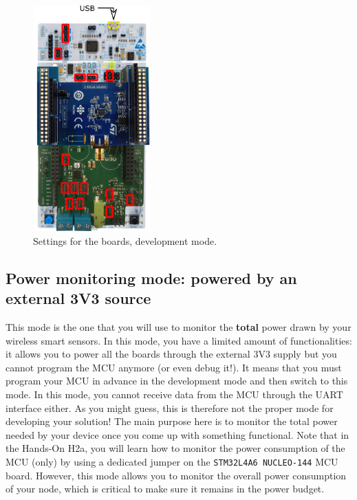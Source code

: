 \begin{figure}[h!]
    \centering
    \includegraphics[width=0.4\textwidth]{figs/settings-mode-dev.png}
    \caption{Settings for the boards, development mode.}
    \label{fig:settings-mode-dev}
\end{figure}

\clearpage
\subsection{Power monitoring mode: powered by an external 3V3 source} \label{sec:mode-3V3}

This mode is the one that you will use to monitor the \textbf{total} power drawn by your wireless smart sensors. In this mode, you have a limited amount of functionalities: it allows you to power all the boards through the external 3V3 supply but you cannot program the MCU anymore (or even debug it!). It means that you must program your MCU in advance in the development mode and then switch to this mode. In this mode, you cannot receive data from the MCU through the UART interface either. As you might guess, this is therefore not the proper mode for developing your solution! The main purpose here is to monitor the total power needed by your device once you come up with something functional. Note that in the Hands-On H2a, you will learn how to monitor the power consumption of the MCU (only) by using a dedicated jumper on the \texttt{STM32L4A6 NUCLEO-144} MCU board. However, this mode allows you to monitor the overall power consumption of your node, which is critical to make sure it remains in the power budget.

